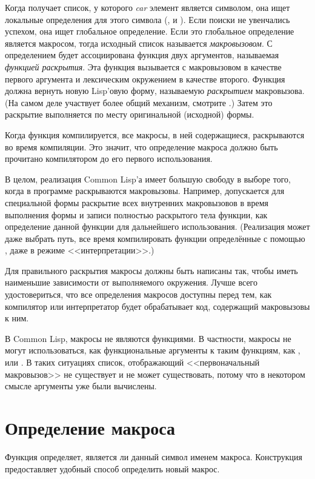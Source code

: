 Когда  получает список, у которого \emph{car} элемент является
символом, она ищет локальные определения для этого символа (,
 и ). Если поиски не увенчались успехом, она ищет
глобальное определение. Если это глобальное определение является макросом, тогда
исходный список называется \emph{макровызовом}. С определением будет
ассоциирована функция двух аргументов, называемая \emph{функцией раскрытия}. 
Эта функция вызывается с макровызовом в качестве первого аргумента и лексическим
окружением в качестве второго. Функция должна вернуть новую Lisp'овую форму,
называемую \emph{раскрытием} макровызова. (На самом деле участвует более общий
механизм, смотрите .)
Затем это раскрытие выполняется по месту оригинальной (исходной) формы.

Когда функция компилируется, все макросы, в ней содержащиеся, раскрываются во
время компиляции. Это значит, что определение макроса должно быть прочитано
компилятором до его первого использования.

В целом, реализация Common Lisp'а имеет большую свободу в выборе того, когда в
программе раскрываются макровызовы.
Например, допускается для специальной формы  раскрытие всех
внутренних макровызовов в время выполнения формы  и записи полностью
раскрытого тела функции, как определение данной функции для дальнейшего
использования.
(Реализация может даже выбрать путь, все время компилировать функции
определённые с помощью , даже в режиме <<интерпретации>>.)

Для правильного раскрытия макросы должны быть написаны так, чтобы иметь
наименьшие зависимости от выполняемого окружения. Лучше всего удостовериться,
что все определения макросов доступны перед тем, как компилятор или
интерпретатор будет обрабатывает код, содержащий макровызовы к ним. 

В Common Lisp, макросы не являются функциями.
В частности, макросы не могут использоваться, как функциональные аргументы к
таким функциям, как ,  или . В таких ситуациях
список, отображающий <<первоначальный макровызов>> не существует и не может
существовать, потому что в некотором смысле аргументы уже были вычислены.

\section{Определение макроса}

Функция  определяет, является ли данный символ именем
макроса. Конструкция  предоставляет удобный способ определить
новый макрос.

